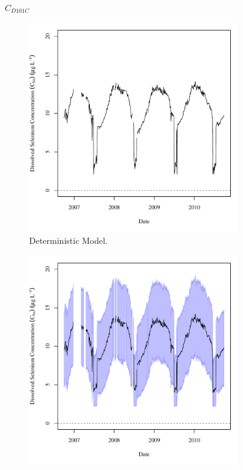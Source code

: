 \begin{linenumbers}
\subfiguretop
\begin{landscape}
	\begin{figure}
		$ C_{D101C} $
		\begin{subfigure}{0.7\textwidth}
			\centering
			\includegraphics[width=\tableCustomSize]{"Figures/Results_DSR/Deterministic/c TS D101C"}
			\caption{Deterministic Model.}
		\end{subfigure}%
		\begin{subfigure}{0.7\textwidth}
			\centering
			\includegraphics[width=\tableCustomSize]{"Figures/Results_DSR/Stochastic/c TS D101C"}

\end{subfigure}
\end{figure}
\end{landscape}
\end{linenumbers}
